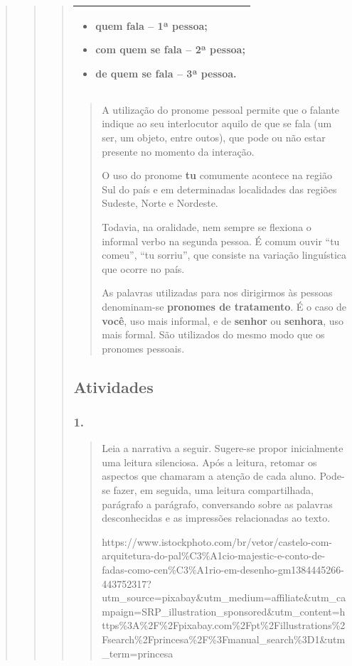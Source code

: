 \begin{quote}
\begin{quote}
\begin{quote}
\begin{longtable}[]{@{}l@{}}
\begin{minipage}[t]{0.97\columnwidth}
\begin{itemize}
\item
  quem fala -- 1ª pessoa;
\item
  com quem se fala -- 2ª pessoa;
\item
  de quem se fala -- 3ª pessoa.
\end{itemize}\strut
\end{minipage}\tabularnewline
\bottomrule
\end{longtable}

\begin{quote}
A utilização do pronome pessoal permite que o falante indique ao seu
interlocutor aquilo de que se fala (um ser, um objeto, entre outos), que
pode ou não estar presente no momento da interação.

O uso do pronome \textbf{tu} comumente acontece na região Sul do país e
em determinadas localidades das regiões Sudeste, Norte e Nordeste.

Todavia, na oralidade, nem sempre se flexiona o informal verbo na
segunda pessoa. É comum ouvir ``tu comeu'', ``tu sorriu'', que consiste
na variação linguística que ocorre no país.

As palavras utilizadas para nos dirigirmos às pessoas denominam-se
\textbf{pronomes de tratamento}. É o caso de \textbf{você}, uso mais
informal, e de \textbf{senhor} ou \textbf{senhora}, uso mais formal. São
utilizados do mesmo modo que os pronomes pessoais.
\end{quote}

\subsection{Atividades}\label{atividades-9}

\subsubsection{1. }\label{section-71}

\begin{quote}
Leia a narrativa a seguir. Sugere-se propor inicialmente uma leitura
silenciosa. Após a leitura, retomar os aspectos que chamaram a atenção
de cada aluno. Pode-se fazer, em seguida, uma leitura compartilhada,
parágrafo a parágrafo, conversando sobre as palavras desconhecidas e as
impressões relacionadas ao texto.

https://www.istockphoto.com/br/vetor/castelo-com-arquitetura-do-pal\%C3\%A1cio-majestic-e-conto-de-fadas-como-cen\%C3\%A1rio-em-desenho-gm1384445266-443752317?utm\_source=pixabay\&utm\_medium=affiliate\&utm\_campaign=SRP\_illustration\_sponsored\&utm\_content=https\%3A\%2F\%2Fpixabay.com\%2Fpt\%2Fillustrations\%2Fsearch\%2Fprincesa\%2F\%3Fmanual\_search\%3D1\&utm\_term=princesa


\end{quote}
\end{quote}
\end{quote}
\end{quote}

